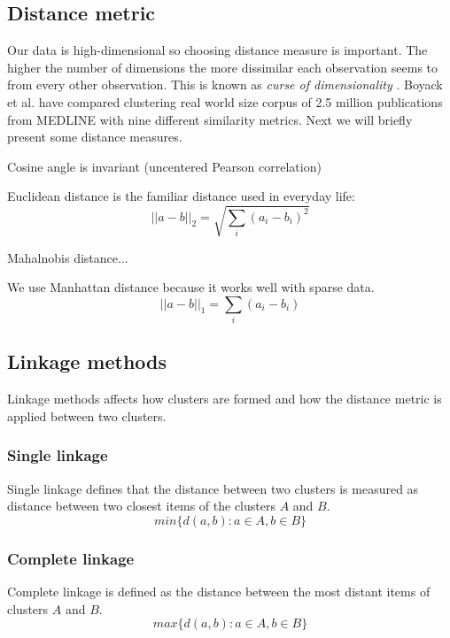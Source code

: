 \subsection{Distance metric}
Our data is high-dimensional so choosing distance measure is 
important. The higher the number of dimensions the more 
dissimilar each observation seems to from every other observation. 
This is known as \emph{curse of dimensionality} .
Boyack et al. have compared clustering real world size corpus of 
2.5 million publications from MEDLINE with nine different 
similarity metrics. \cite{boyack_clustering_2011}
Next we will briefly present some distance measures.

Cosine angle is invariant (uncentered Pearson 
correlation)

Euclidean distance is the familiar distance used in everyday life:
\begin{equation}
 ||a-b||_2 = \sqrt{\sum_i{(a_i-b_i)^2}}
\end{equation}

Mahalnobis distance...

We use Manhattan distance because it works well with sparse data.
\cite{ref_here}
\begin{equation}
 ||a-b||_1 = \sum_i{(a_i-b_i)}
\end{equation}


\subsection{Linkage methods}


Linkage methods affects how clusters are formed and how the 
distance metric is applied between two clusters.

\subsubsection{Single linkage}
Single linkage defines that the distance between two clusters is 
measured as distance between two closest items of the clusters 
$A$ and $B$.
\begin{equation}
 min\{d(a,b):a \in A, b \in B\}
\end{equation}

\subsubsection{Complete linkage}
Complete linkage is defined as the distance between the most 
distant items of clusters $A$ and $B$.
\begin{equation}
 max\{d(a,b):a \in A, b \in B\}
\end{equation}

